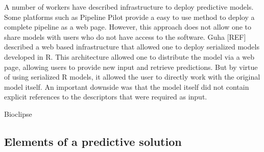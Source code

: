 \documentclass[12pt,letterpaper]{article}
\begin{document}
A number of workers have described infrastructure to deploy predictive
models. Some platforms such as Pipeline Pilot provide a easy to use
method to deploy a complete pipeline as a web page. However, this
approach does not allow one to share models with users who do not have
access to the software. Guha [REF] described a web based
infrastructure that allowed one to deploy serialized models developed
in R. This architecture allowed one to distribute the model via a web
page, allowing users to provide new input and retrieve
predictions. But by virtue of using serialized R models, it allowed
the user to directly work with the original model itself. An important
downside was that the model itself did not contain explicit references
to the descriptors that were required as input. 

Bioclipse

\subsection{Elements of a predictive solution}
\end{document}
